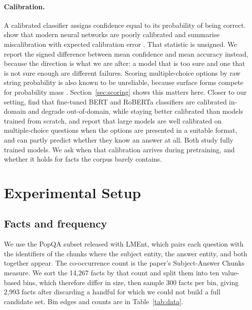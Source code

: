 \documentclass[11pt]{article}
\begin{document}
\paragraph{Calibration.}
A calibrated classifier assigns confidence equal to its probability of being correct.
\citet{guo-etal-2017-calibration} show that modern neural networks are poorly calibrated and
summarise miscalibration with expected calibration error
\citep{naeini-etal-2015-obtaining}. That statistic is unsigned. We report the signed difference
between mean confidence and mean accuracy instead, because the direction is what we are after: a
model that is too sure and one that is not sure enough are different failures. Scoring multiple-choice options by raw string probability is also known to be
unreliable, because surface forms compete for probability mass
\citep{holtzman-etal-2021-surface}. Section~\ref{sec:scoring} shows this matters here.
Closer to our setting, \citet{desai-durrett-2020-calibration} find that fine-tuned BERT and
RoBERTa classifiers are calibrated in-domain and degrade out-of-domain, while staying better
calibrated than models trained from scratch, and \citet{kadavath-etal-2022-language} report that
large models are well calibrated on multiple-choice questions when the options are presented in a
suitable format, and can partly predict whether they know an answer at all. Both study
fully trained models. We ask when that calibration arrives during pretraining, and whether it
holds for facts the corpus barely contains.

\section{Experimental Setup}

\subsection{Facts and frequency}

We use the PopQA subset released with LMEnt, which pairs each question with the identifiers of
the chunks where the subject entity, the answer entity, and both together appear. The
co-occurrence count is the paper's Subject-Answer Chunks measure. We sort the 14{,}267 facts by
that count and split them into ten value-based bins, which therefore differ in size, then
sample 300 facts per bin, giving 2{,}993 facts
after discarding a handful for which we could not build a full candidate set. Bin edges and
counts are in Table~\ref{tab:data}.
\end{document}
